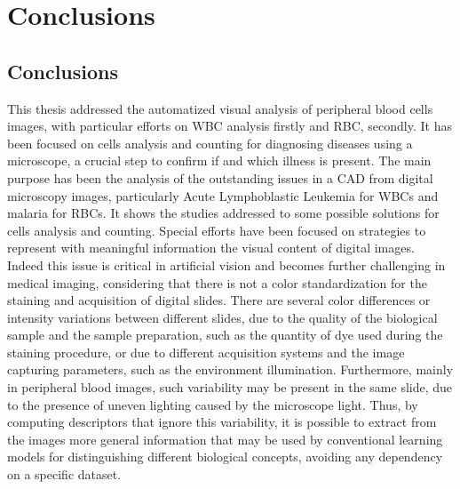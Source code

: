 \documentclass[final,a4paper,12pt,english]{UnicaPhdThesis3}
\begin{document}
{\part{Conclusions} 
\chapter*{Conclusions} \label{tre}
This thesis addressed the automatized visual analysis of peripheral blood cells images, with particular efforts on WBC analysis firstly and RBC, secondly. It has been focused on cells analysis and counting for diagnosing diseases using a microscope, a crucial step to confirm if and which illness is present. The main purpose has been the analysis of the outstanding issues in a CAD from digital microscopy images, particularly Acute Lymphoblastic Leukemia for WBCs and malaria for RBCs. It shows the studies addressed to some possible solutions for cells analysis and counting. Special efforts have been focused on strategies to represent with meaningful information the visual content of digital images. Indeed this issue is critical in artificial vision and becomes further challenging in medical imaging, considering that there is not a color standardization for the staining and acquisition of digital slides. There are several color differences or intensity variations between different slides, due to the quality of the biological sample and the sample preparation, such as the quantity of dye used during the staining procedure, or due to different acquisition systems and the image capturing parameters, such as the environment illumination. Furthermore, mainly in peripheral blood images, such variability may be present in the same slide, due to the presence of uneven lighting caused by the microscope light. Thus, by computing descriptors that ignore this variability, it is possible to extract from the images more general information that may be used by conventional learning models for distinguishing different biological concepts, avoiding any dependency on a specific dataset. 

}
\end{document}
